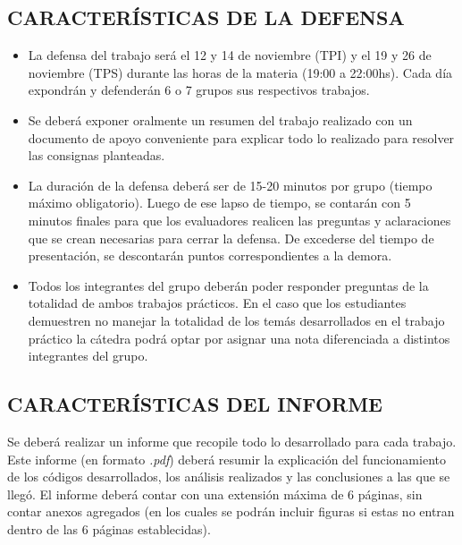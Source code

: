 \documentclass[10pt]{article}
\begin{document}
\vspace{0.25cm}

\subsection{CARACTERÍSTICAS DE LA DEFENSA}
\begin{itemize} 

    \item La defensa del trabajo será el 12 y 14 de noviembre (TPI) y el 19 y 26 de noviembre (TPS) durante las horas de la materia (19:00 a 22:00hs). Cada día expondrán y defenderán 6 o 7 grupos sus respectivos trabajos.
    
    \item Se deberá exponer oralmente un resumen del trabajo realizado con un documento de apoyo conveniente para explicar todo lo realizado para resolver las consignas planteadas.
    
    \item La duración de la defensa deberá ser de 15-20 minutos por grupo (tiempo máximo obligatorio). Luego de ese lapso de tiempo, se contarán con 5 minutos finales para que los evaluadores realicen las preguntas y aclaraciones que se crean necesarias para cerrar la defensa. De excederse del tiempo de presentación, se descontarán puntos correspondientes a la demora. 

    \item Todos los integrantes del grupo deberán poder responder preguntas de la totalidad de ambos trabajos prácticos. En el caso que los estudiantes demuestren no manejar la totalidad de los temás desarrollados en el trabajo práctico la cátedra podrá optar por asignar una nota diferenciada a distintos integrantes del grupo. 
\end{itemize}

\vspace{0.25cm}

\subsection{CARACTERÍSTICAS DEL INFORME} \label{ch:informe}

Se deberá realizar un informe que recopile todo lo desarrollado para cada trabajo. Este informe (en formato \textit{.pdf}) deberá resumir la explicación del funcionamiento de los códigos desarrollados, los análisis realizados y las conclusiones a las que se llegó.  El informe deberá contar con una extensión máxima de 6 páginas, sin contar anexos agregados (en los cuales se podrán incluir figuras si estas no entran dentro de las 6 páginas establecidas). 
\end{document}
